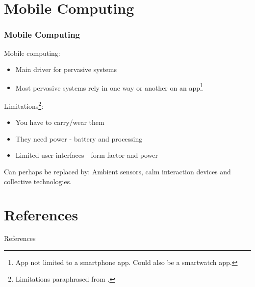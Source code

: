 \documentclass[10pt]{beamer}
\begin{document}
\section{Mobile Computing}

\begin{frame}
  \frametitle{Mobile Computing}
  Mobile computing:
  \vspace*{-1em}
  \begin{itemize}
    \item Main driver for pervasive systems
    \item Most pervasive systems rely in one way or another on an app\footnote{App not limited to a smartphone app. Could also be a smartwatch app.}
  \end{itemize}

  Limitations\footnote{Limitations paraphrased from \cite{wagnerPervasiveComputing2022}.}:
  \vspace*{-1em}
  \begin{itemize}
    \item You have to carry/wear them
    \item They need power - battery and processing
    \item Limited user interfaces - form factor and power
  \end{itemize}

  Can perhaps be replaced by: Ambient sensors, calm interaction devices and collective technologies.
\end{frame}

\section{References}
\begin{frame}[allowframebreaks]{References}
  
  
\end{frame}
\end{document}
